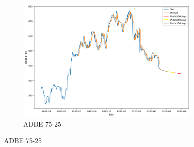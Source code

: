 \documentclass{ieeeojies}
\begin{document}
\begin{figure}[H]
\begin{subfigure}[b]{0.33\linewidth}
        \centering
        \includegraphics[width=\linewidth]{GRU Plot/GRU_ADBE_75_25.png}
        \caption{ADBE 75-25}
        \label{fig:adbe-75-25}
    \end{subfigure}
    \vspace{10pt}
\end{figure}
 \vspace{-20pt}
\end{document}
